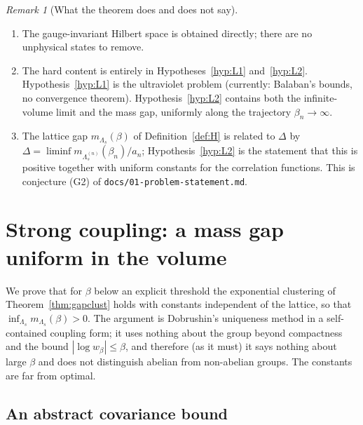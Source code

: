 \documentclass[11pt,a4paper]{article}
\theoremstyle{definition}
\theoremstyle{remark}
\newtheorem{remark}[theorem]{Remark}
\begin{document}
\begin{remark}[What the theorem does and does not say]
\begin{enumerate}[label=(\roman*)]
\item The gauge-invariant Hilbert space is obtained directly; there are no unphysical states to remove.
\item The hard content is entirely in Hypotheses~\ref{hyp:L1} and~\ref{hyp:L2}. Hypothesis~\ref{hyp:L1} is the
ultraviolet problem (currently: Balaban's bounds, no convergence theorem). Hypothesis~\ref{hyp:L2} contains both the
infinite-volume limit and the mass gap, uniformly along the trajectory $\beta_n\to\infty$.
\item The lattice gap $m_{\Lambda_s}(\beta)$ of Definition~\ref{def:H} is related to $\Delta$ by
$\Delta=\liminf m_{\Lambda_s^{(n)}}(\beta_n)/a_n$; Hypothesis~\ref{hyp:L2} is the statement that this is positive together
with uniform constants for the correlation functions. This is conjecture (G2) of \texttt{docs/01-problem-statement.md}.
\end{enumerate}
\end{remark}

\section{Strong coupling: a mass gap uniform in the volume}\label{sec:strong}

We prove that for $\beta$ below an explicit threshold the exponential clustering of Theorem~\ref{thm:gapclust}
holds with constants independent of the lattice, so that $\inf_{\Lambda_s}m_{\Lambda_s}(\beta)>0$. The argument is
Dobrushin's uniqueness method in a self-contained coupling form; it uses nothing about the group beyond compactness
and the bound $|{\log w_\beta}|\le\beta$, and therefore (as it must) it says nothing about large $\beta$ and does not
distinguish abelian from non-abelian groups. The constants are far from optimal.

\subsection{An abstract covariance bound}
\end{document}
